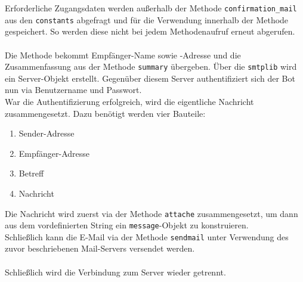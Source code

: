                 Erforderliche Zugangsdaten werden außerhalb der Methode \verb|confirmation_mail| aus den \verb|constants| abgefragt und für die Verwendung innerhalb der Methode gespeichert. So werden diese nicht bei jedem Methodenaufruf erneut abgerufen.\\
                \\
                Die Methode bekommt Empfänger-Name sowie -Adresse und die Zusammenfassung aus der Methode \verb|summary| übergeben. Über die \verb|smtplib| wird ein Server-Objekt erstellt. Gegenüber diesem Server authentifiziert sich der Bot nun via Benutzername und Passwort.\\
                War die Authentifizierung erfolgreich, wird die eigentliche Nachricht zusammengesetzt. Dazu benötigt werden vier Bauteile: 
                \begin{enumerate}
                    \item Sender-Adresse
                    \item Empfänger-Adresse
                    \item Betreff
                    \item Nachricht
                \end{enumerate}
                Die Nachricht wird zuerst via der Methode \verb|attache| zusammengesetzt, um dann aus dem vordefinierten String ein \verb|message|-Objekt zu konstruieren.\\
                Schließlich kann die E-Mail via der Methode \verb|sendmail| unter Verwendung des zuvor beschriebenen Mail-Servers versendet werden.\\
                \\
                Schließlich wird die Verbindung zum Server wieder getrennt.


